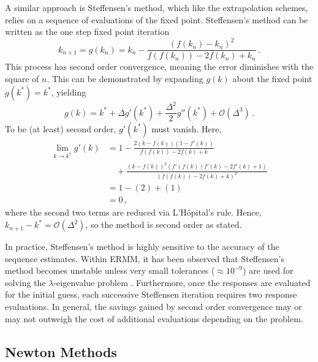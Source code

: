 A similar approach is Steffensen's method, which
like the extrapolation schemes, relies on a sequence of evaluations 
of the fixed point.
Steffensen's method can be written as the one step fixed point iteration
\begin{equation}
 k_{n+1} = g(k_n) = k_{n} - \frac{(f(k_n) - k_n)^2} 
                     {f(f(k_n)) - 2 f(k_n) + k_n}  \, .
\end{equation}
This process has second order convergence, meaning the error 
diminishes with the square of $n$.  This can be 
demonstrated by expanding $g(k)$ about the fixed point $g(k^*)=k^*$, yielding
\begin{equation}
 g(k) = k^* + \Delta g'(k^*) + \frac{\Delta^2}{2} g''(k^*) 
               + \mathcal{O}(\Delta^3) \, .
\end{equation}
To be (at least) second order, $g'(k^*)$ must vanish.  Here,
\begin{equation}
\begin{split}
  \lim_{k\to k^*}
    g'(k) &= 1 - \frac{2(k-f(k))(1-f'(k))}
                      {f(f(k))-2f(k)+k}\\
          & \quad + \frac{(k-f(k))^2(f'(f(k))f'(k) - 2f'(k)+1)}
                      {(f(f(k))-2f(k)+k)^2} \\
          &= 1 - (2) + (1) \\
          &= 0 \, ,
\end{split}
\end{equation}
where the second two terms are reduced via L'H\^{o}pital's rule.  Hence,
$k_{n+1} - k^* = \mathcal{O}(\Delta^2)$, so the method is second 
order as stated.

In practice, Steffensen's method is highly sensitive to the 
accuracy of the sequence estimates.  Within ERMM, it
has been observed that Steffensen's method becomes unstable
unless very small tolerances ($\approx 10^{-9}$) are used 
for solving the $\lambda$-eigenvalue problem \cite{roberts2012ksi}.
Furthermore,  once the responses are evaluated for the initial
guess, each successive Steffensen iteration requires two response 
evaluations.  In general, the savings gained by second order convergence 
may or may not outweigh the cost of additional evaluations depending 
on the problem.


\subsection{Newton Methods}

